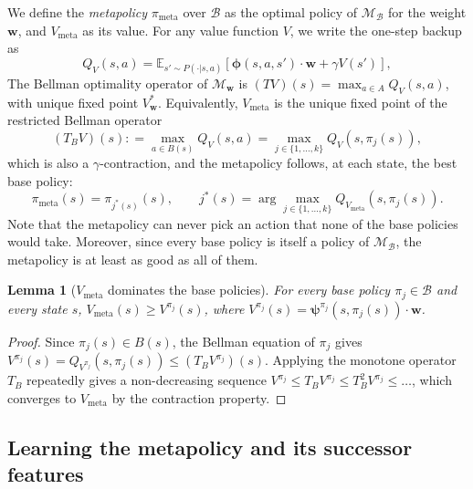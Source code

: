 \documentclass[11pt]{article}
\newcommand{\vphi}{\bm{\phi}}      %
\newcommand{\vpsi}{\bm{\psi}}      %
\newtheorem{lemma}{Lemma}
\begin{document}
We define the \textit{metapolicy} $\pi_{\mathrm{meta}}$ over $\mathcal{B}$ as the optimal policy of $\mathcal{M}_{\mathcal{B}}$ for the weight $\mathbf{w}$, and $V_{\mathrm{meta}}$ as its value. For any value function $V$, we write the one-step backup as
\begin{equation}
    Q_V(s,a) = \mathbb{E}_{s' \sim P(\cdot|s,a)} \left[ \vphi(s,a,s') \cdot \mathbf{w} + \gamma V(s') \right],
\end{equation}
The Bellman optimality operator of $\mathcal{M}_{\mathbf{w}}$ is $(TV)(s) = \max_{a \in A} Q_V(s,a)$, with unique fixed point $V^*_{\mathbf{w}}$. Equivalently, $V_{\mathrm{meta}}$ is the unique fixed point of the restricted Bellman operator
\begin{equation}
    (T_B V)(s) : = \max_{a \in B(s)} Q_V(s,a) = \max_{j \in \{1,\dots,k\}} Q_V(s, \pi_j(s)),
\end{equation}
which is also a $\gamma$-contraction, and the metapolicy follows, at each state, the best base policy:
\begin{equation}\label{eq:metapolicy}
    \pi_{\mathrm{meta}}(s) = \pi_{j^*(s)}(s), \qquad j^*(s) = \arg\max_{j \in \{1,\dots,k\}} Q_{V_{\mathrm{meta}}}(s, \pi_j(s)).
\end{equation}
Note that the metapolicy can never pick an action that none of the base policies would take. Moreover, since every base policy is itself a policy of $\mathcal{M}_{\mathcal{B}}$, the metapolicy is at least as good as all of them.

\begin{lemma}[$V_{\mathrm{meta}}$ dominates the base policies]\label{lem:meta-dominates}
    For every base policy $\pi_j \in \mathcal{B}$ and every state $s$, $V_{\mathrm{meta}}(s) \geq V^{\pi_j}(s)$, where $V^{\pi_j}(s) = \vpsi^{\pi_j}(s, \pi_j(s)) \cdot \mathbf{w}$.
\end{lemma}
\begin{proof}
    Since $\pi_j(s) \in B(s)$, the Bellman equation of $\pi_j$ gives $V^{\pi_j}(s) = Q_{V^{\pi_j}}(s, \pi_j(s)) \leq (T_B V^{\pi_j})(s)$. Applying the monotone operator $T_B$ repeatedly gives a non-decreasing sequence $V^{\pi_j} \leq T_B V^{\pi_j} \leq T_B^2 V^{\pi_j} \leq \dots$, which converges to $V_{\mathrm{meta}}$ by the contraction property.
\end{proof}

\subsection{Learning the metapolicy and its successor features}
\end{document}
